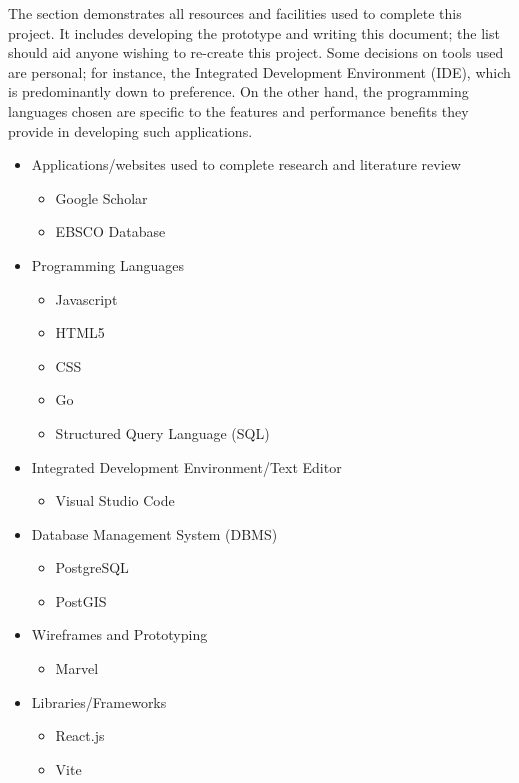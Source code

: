The section demonstrates all resources and facilities used to complete this project. It includes developing the prototype and writing this document; the list should aid anyone wishing to re-create this project. Some decisions on tools used are personal; for instance, the Integrated Development Environment (IDE), which is predominantly down to preference. On the other hand, the programming languages chosen are specific to the features and performance benefits they provide in developing such applications.

\begin{itemize}
    \item Applications/websites used to complete research and literature review
    \begin{itemize}
        \item Google Scholar
        \item EBSCO Database
    \end{itemize}
    \item Programming Languages
    \begin{itemize}
        \item Javascript
        \item HTML5
        \item CSS
        \item Go
        \item Structured Query Language (SQL)
    \end{itemize}
    \item Integrated Development Environment/Text Editor
    \begin{itemize}
        \item Visual Studio Code
    \end{itemize}
    \item Database Management System (DBMS)
    \begin{itemize}
        \item PostgreSQL
        \item PostGIS
    \end{itemize}
    \item Wireframes and Prototyping
    \begin{itemize}
        \item Marvel
    \end{itemize}
    \item Libraries/Frameworks
    \begin{itemize}
        \item React.js
        \item Vite

\end{itemize}
\end{itemize}
